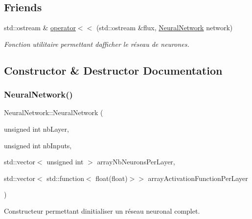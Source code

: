 \subsection*{Friends}
\begin{DoxyCompactItemize}
\item 
std\+::ostream \& \hyperlink{classNeuralNetwork_a0ecebf9a494437efb917804ed271e13f}{operator$<$$<$} (std\+::ostream \&flux, \hyperlink{classNeuralNetwork}{Neural\+Network} network)
\begin{DoxyCompactList}\small\item\em Fonction utilitaire permettant d\textquotesingle{}afficher le réseau de neurones. \end{DoxyCompactList}\end{DoxyCompactItemize}


\subsection{Constructor \& Destructor Documentation}
\mbox{\label{classNeuralNetwork_a3caa6a6f94e1dda424149308752fe69a}} 
\subsubsection{\texorpdfstring{Neural\+Network()}{NeuralNetwork()}\hspace{0.1cm}{\footnotesize\ttfamily [1/3]}}
{\footnotesize\ttfamily Neural\+Network\+::\+Neural\+Network (\begin{DoxyParamCaption}\item[{unsigned int}]{nb\+Layer,  }\item[{unsigned int}]{nb\+Inputs,  }\item[{std\+::vector$<$ unsigned int $>$}]{array\+Nb\+Neurons\+Per\+Layer,  }\item[{std\+::vector$<$ std\+::function$<$ float(float)$>$$>$}]{array\+Activation\+Function\+Per\+Layer }\end{DoxyParamCaption})}



Constructeur permettant d\textquotesingle{}initialiser un réseau neuronal complet. 


